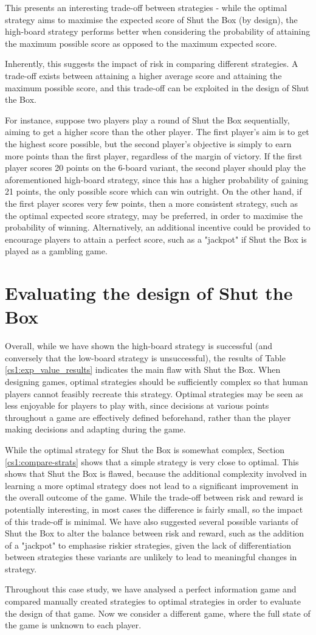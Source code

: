 This presents an interesting trade-off between strategies - while the optimal strategy aims to maximise the expected score of Shut the Box (by design), the high-board strategy performs better when considering the probability of attaining the maximum possible score as opposed to the maximum expected score.

Inherently, this suggests the impact of risk in comparing different strategies. A trade-off exists between attaining a higher average score and attaining the maximum possible score, and this trade-off can be exploited in the design of Shut the Box.

For instance, suppose two players play a round of Shut the Box sequentially, aiming to get a higher score than the other player. The first player's aim is to get the highest score possible, but the second player's objective is simply to earn more points than the first player, regardless of the margin of victory. If the first player scores 20 points on the 6-board variant, the second player should play the aforementioned high-board strategy, since this has a higher probability of gaining 21 points, the only possible score which can win outright. On the other hand, if the first player scores very few points, then a more consistent strategy, such as the optimal expected score strategy, may be preferred, in order to maximise the probability of winning. Alternatively, an additional incentive could be provided to encourage players to attain a perfect score, such as a "jackpot" if Shut the Box is played as a gambling game.

\section{Evaluating the design of Shut the Box}
\label{cs1:eval_stb}

Overall, while we have shown the high-board strategy is successful (and conversely that the low-board strategy is unsuccessful), the results of Table \ref{cs1:exp_value_results} indicates the main flaw with Shut the Box. When designing games, optimal strategies should be sufficiently complex so that human players cannot feasibly recreate this strategy. Optimal strategies may be seen as less enjoyable for players to play with, since decisions at various points throughout a game are effectively defined beforehand, rather than the player making decisions and adapting during the game. 

While the optimal strategy for Shut the Box is somewhat complex, Section \ref{cs1:compare-strats} shows that a simple strategy is very close to optimal. This shows that Shut the Box is flawed, because the additional complexity involved in learning a more optimal strategy does not lead to a significant improvement in the overall outcome of the game. While the trade-off between risk and reward is potentially interesting, in most cases the difference is fairly small, so the impact of this trade-off is minimal. We have also suggested several possible variants of Shut the Box to alter the balance between risk and reward, such as the addition of a "jackpot" to emphasise riskier strategies, given the lack of differentiation between strategies these variants are unlikely to lead to meaningful changes in strategy.

Throughout this case study, we have analysed a perfect information game and compared manually created strategies to optimal strategies in order to evaluate the design of that game. Now we consider a different game, where the full state of the game is unknown to each player.